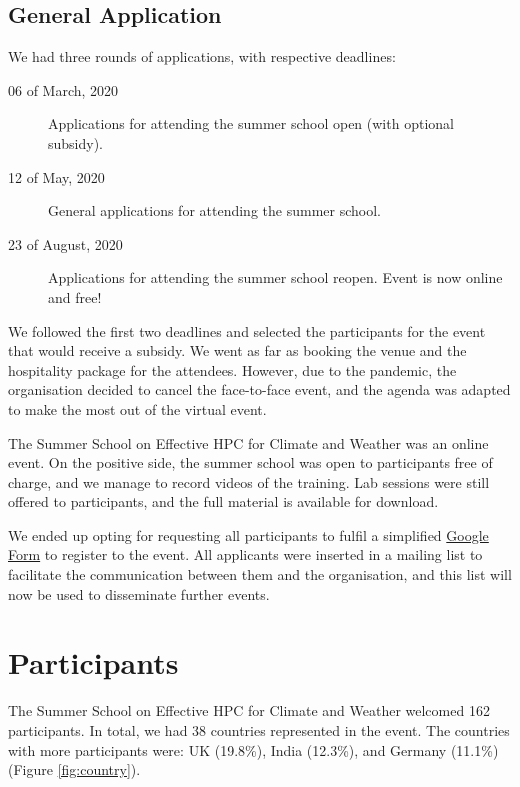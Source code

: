 \subsection{General Application}

We had three rounds of applications, with respective deadlines:

\begin{description}

\item[06 of March, 2020] Applications for attending the summer school open (with optional subsidy).

\item[12 of May, 2020] General applications for attending the summer school.

\item[23 of August, 2020] Applications for attending the summer school reopen. Event is now online and free!

\end{description}

We followed the first two deadlines and selected the participants for the event that would receive a subsidy. We went as far as booking the venue and the hospitality package for the attendees. However, due to the pandemic, the organisation decided to cancel the face-to-face event, and the agenda was adapted to make the most out of the virtual event.

The Summer School on Effective HPC for Climate and Weather was an online event. On the positive side, the summer school was open to participants free of charge, and we manage to record videos of the training. Lab sessions were still offered to participants, and the full material is available for download.

We ended up opting for requesting all participants to fulfil a simplified \href{https://docs.google.com/forms/d/1jytBiXi3RMdmnzyZc08L82krIhWzetWH909enjLhm9E/}{Google Form} to register to the event. All applicants were inserted in a mailing list to facilitate the communication between them and the organisation, and this list will now be used to disseminate further events.

\section{Participants}

The Summer School on Effective HPC for Climate and Weather welcomed 162 participants. In total, we had 38 countries represented in the event. The countries with more participants were: UK (19.8\%), India (12.3\%), and Germany (11.1\%) (Figure \ref{fig:country}).

